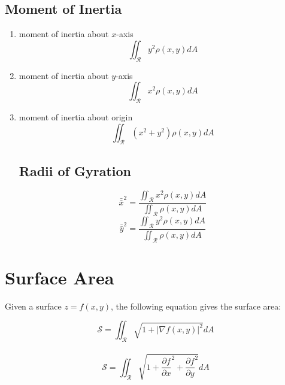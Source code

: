 \documentclass[UTF8,a4paper, 10pt, openany]{svmono}
\begin{document}
\subsection{Moment of Inertia}
\begin{enumerate}
\item moment of inertia about $x$-axis
$$\iint_{\mathcal{R}}y^2\rho (x,y)dA$$
\item moment of inertia about $y$-axis
$$\iint_{\mathcal{R}}x^2\rho (x,y)dA$$
\item moment of inertia about origin\
$$\iint_{\mathcal{R}}(x^2+y^2)\rho (x,y)dA$$
\subsection{Radii of Gyration}
$$\bar{\bar{x}}^2=\frac{\displaystyle\iint_{\mathcal{R}}x^2\rho (x,y)dA}{\displaystyle\iint_{\mathcal{R}}\rho (x,y)dA}$$
$$\bar{\bar{y}}^2=\frac{\displaystyle\iint_{\mathcal{R}}y^2\rho (x,y)dA}{\displaystyle\iint_{\mathcal{R}}\rho (x,y)dA}$$
\end{enumerate}



\section{Surface Area}
Given a surface $z=f(x,y)$, the following equation gives the surface area:
\begin{center}
$$\mathcal{S}=\iint_{\mathcal{R}}\sqrt{1+|\nabla f(x,y)|^2}dA$$\\
$$\mathcal{S}=\iint_{\mathcal{R}}\sqrt{1+\frac{\partial f}{\partial x}^2+\frac{\partial f}{\partial y}^2}dA$$
\end{center}
\end{document}
